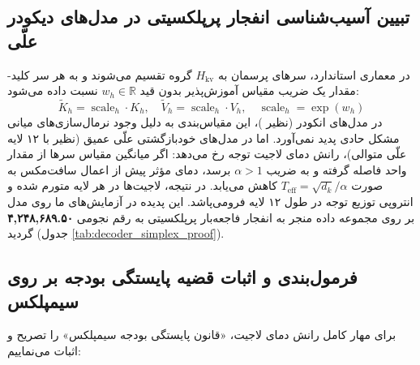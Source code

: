 \documentclass[12pt,a4paper]{report}
\theoremstyle{definition}
\begin{document}
\subsection{تبیین آسیب‌شناسی انفجار پرپلکسیتی در مدل‌های دیکودر علّی}
در معماری  استاندارد، سرهای پرسمان به $H_{\text{kv}}$ گروه تقسیم می‌شوند و به هر سر کلید-مقدار یک ضریب مقیاس آموزش‌پذیر بدون قید $w_h \in \mathbb{R}$ نسبت داده می‌شود:
\begin{equation}
    \tilde{K}_h = \operatorname{scale}_h \cdot K_h, \quad \tilde{V}_h = \operatorname{scale}_h \cdot V_h, \quad \operatorname{scale}_h = \exp(w_h)
\end{equation}
در مدل‌های انکودر (نظیر )، این مقیاس‌بندی به دلیل وجود نرمال‌سازی‌های میانی مشکل حادی پدید نمی‌آورد. اما در مدل‌های خودبازگشتی علّی عمیق (نظیر  با ۱۲ لایه علّی متوالی)، رانش دمای لاجیت توجه رخ می‌دهد: اگر میانگین مقیاس سرها از مقدار واحد فاصله گرفته و به ضریب $\alpha > 1$ برسد، دمای مؤثر پیش از اعمال سافت‌مکس به صورت $T_{\text{eff}} = \sqrt{d_k} / \alpha$ کاهش می‌یابد. در نتیجه، لاجیت‌ها در هر لایه متورم شده و انتروپی توزیع توجه در طول ۱۲ لایه فرومی‌پاشد.
این پدیده در آزمایش‌های ما روی مدل  بر روی مجموعه داده  منجر به انفجار فاجعه‌بار پرپلکسیتی به رقم نجومی \textbf{۴,۲۴۸,۶۸۹.۵۰} گردید (جدول \ref{tab:decoder_simplex_proof}).

\subsection{فرمول‌بندی و اثبات قضیه پایستگی بودجه بر روی سیمپلکس}
برای مهار کامل رانش دمای لاجیت، «قانون پایستگی بودجه سیمپلکس» را تصریح و اثبات می‌نماییم:
\end{document}
